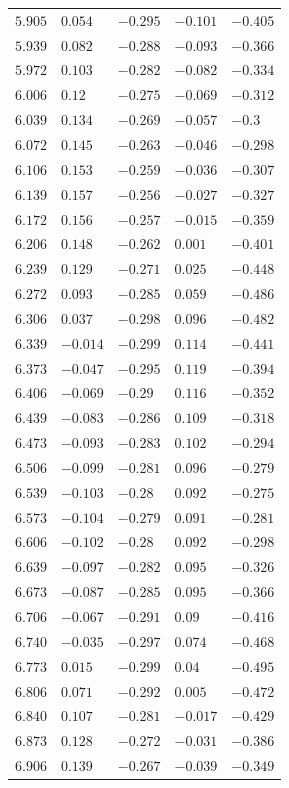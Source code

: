 \begin{center}
\begin{longtable}{lllll}
$5.905$&$0.054$&$-0.295$&$-0.101$&$-0.405$\\
$5.939$&$0.082$&$-0.288$&$-0.093$&$-0.366$\\
$5.972$&$0.103$&$-0.282$&$-0.082$&$-0.334$\\
$6.006$&$0.12$&$-0.275$&$-0.069$&$-0.312$\\
$6.039$&$0.134$&$-0.269$&$-0.057$&$-0.3$\\
$6.072$&$0.145$&$-0.263$&$-0.046$&$-0.298$\\
$6.106$&$0.153$&$-0.259$&$-0.036$&$-0.307$\\
$6.139$&$0.157$&$-0.256$&$-0.027$&$-0.327$\\
$6.172$&$0.156$&$-0.257$&$-0.015$&$-0.359$\\
$6.206$&$0.148$&$-0.262$&$0.001$&$-0.401$\\
$6.239$&$0.129$&$-0.271$&$0.025$&$-0.448$\\
$6.272$&$0.093$&$-0.285$&$0.059$&$-0.486$\\
$6.306$&$0.037$&$-0.298$&$0.096$&$-0.482$\\
$6.339$&$-0.014$&$-0.299$&$0.114$&$-0.441$\\
$6.373$&$-0.047$&$-0.295$&$0.119$&$-0.394$\\
$6.406$&$-0.069$&$-0.29$&$0.116$&$-0.352$\\
$6.439$&$-0.083$&$-0.286$&$0.109$&$-0.318$\\
$6.473$&$-0.093$&$-0.283$&$0.102$&$-0.294$\\
$6.506$&$-0.099$&$-0.281$&$0.096$&$-0.279$\\
$6.539$&$-0.103$&$-0.28$&$0.092$&$-0.275$\\
$6.573$&$-0.104$&$-0.279$&$0.091$&$-0.281$\\
$6.606$&$-0.102$&$-0.28$&$0.092$&$-0.298$\\
$6.639$&$-0.097$&$-0.282$&$0.095$&$-0.326$\\
$6.673$&$-0.087$&$-0.285$&$0.095$&$-0.366$\\
$6.706$&$-0.067$&$-0.291$&$0.09$&$-0.416$\\
$6.740$&$-0.035$&$-0.297$&$0.074$&$-0.468$\\
$6.773$&$0.015$&$-0.299$&$0.04$&$-0.495$\\
$6.806$&$0.071$&$-0.292$&$0.005$&$-0.472$\\
$6.840$&$0.107$&$-0.281$&$-0.017$&$-0.429$\\
$6.873$&$0.128$&$-0.272$&$-0.031$&$-0.386$\\
$6.906$&$0.139$&$-0.267$&$-0.039$&$-0.349$\\

\end{longtable}
\end{center}
